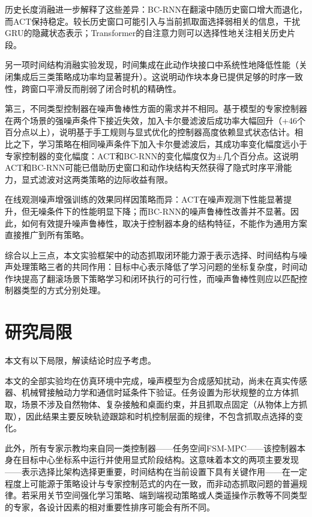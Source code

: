 历史长度消融进一步解释了这些差异：BC-RNN在翻滚中随历史窗口增大而退化，而ACT保持稳定。较长历史窗口可能引入与当前抓取面选择弱相关的信息，干扰GRU的隐藏状态表示；Transformer的自注意力则可以选择性地关注相关历史片段。

另一项时间结构消融实验发现，时间集成在此动作块接口中系统性地降低性能（关闭集成后三类策略成功率均显著提升）。这说明动作块本身已提供足够的时序一致性，跨窗口平滑反而削弱了闭合时机的精确性。

第三，不同类型控制器在噪声鲁棒性方面的需求并不相同。基于模型的专家控制器在两个场景的强噪声条件下接近失效，加入卡尔曼滤波后成功率大幅回升（+46个百分点以上），说明基于手工规则与显式优化的控制器高度依赖显式状态估计。相比之下，学习策略在相同噪声条件下加入卡尔曼滤波后，其成功率变化幅度远小于专家控制器的变化幅度：ACT和BC-RNN的变化幅度仅为$\pm$几个百分点。这说明ACT和BC-RNN可能已借助历史窗口和动作块结构天然获得了隐式时序平滑能力，显式滤波对这两类策略的边际收益有限。

在线观测噪声增强训练的效果同样因策略而异：ACT在噪声观测下性能显著提升，但无噪条件下的性能明显下降；而BC-RNN的噪声鲁棒性改善并不显著。因此，如何有效提升噪声鲁棒性，取决于控制器本身的结构特征，不能作为通用方案直接推广到所有策略。

综合以上三点，本文实验框架中的动态抓取闭环能力源于表示选择、时间结构与噪声处理策略三者的共同作用：目标中心表示降低了学习问题的坐标复杂度，时间动作块提高了翻滚场景下策略学习和闭环执行的可行性，而噪声鲁棒性则应以匹配控制器类型的方式分别处理。

\section{研究局限}\label{sec:limitations}

本文有以下局限，解读结论时应予考虑。

本文的全部实验均在仿真环境中完成，噪声模型为合成感知扰动，尚未在真实传感器、机械臂接触动力学和通信时延条件下验证。任务设置为形状规整的立方体抓取，场景不涉及自然物体、复杂接触和桌面约束，并且抓取点固定（从物体上方抓取），因此结果主要反映轨迹跟踪和时机控制层面的规律，不包含抓取点选择的变化。

此外，所有专家示教均来自同一类控制器——任务空间FSM-MPC——该控制器本身在目标中心坐标系中运行并使用显式阶段结构。这意味着本文的两项主要发现——表示选择比架构选择更重要，时间结构在当前设置下具有关键作用——在一定程度上可能源于策略设计与专家控制范式的内在一致，而非动态抓取问题的普遍规律。若采用关节空间强化学习策略、端到端视动策略或人类遥操作示教等不同类型的专家，各设计因素的相对重要性排序可能会有所不同。


